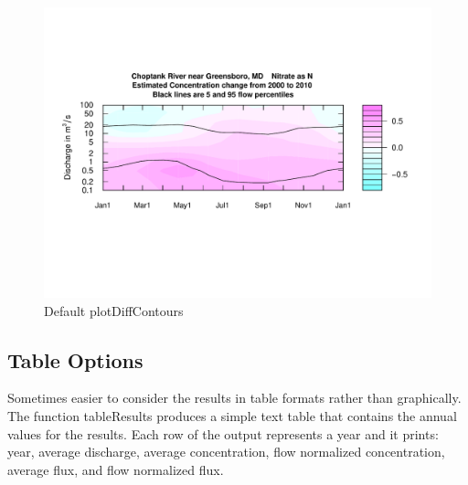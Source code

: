 \documentclass[a4paper,11pt]{article}
\begin{document}
\begin{figure}[htbp]
\begin{center}

\includegraphics{EGRET-figplotDiffContours}

\caption{Default plotDiffContours}
\label{fig:plotDiffContours}
\end{center}
\end{figure}


\FloatBarrier
\subsection{Table Options}
\label{sec:wrtdsTable}
Sometimes easier to consider the results in table formats rather than graphically. The function tableResults produces a simple text table that contains the annual values for the results.  Each row of the output represents a year and it prints: year, average discharge, average concentration, flow normalized concentration, average flux, and flow normalized flux.  
\end{document}
